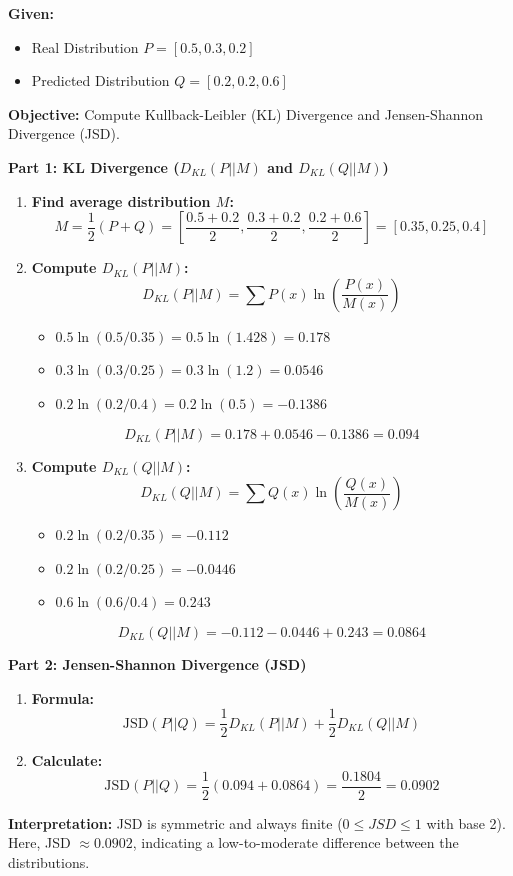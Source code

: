 \documentclass[11pt,a4paper]{article}
\begin{document}
\begin{tcolorbox}[colback=blue!5!white,colframe=blue!75!black,title=\textbf{Numerical 2: KL and JS Divergence}]
\textbf{Given:}
\begin{itemize}
    \item Real Distribution $P = [0.5, 0.3, 0.2]$
    \item Predicted Distribution $Q = [0.2, 0.2, 0.6]$
\end{itemize}

\textbf{Objective:} Compute Kullback-Leibler (KL) Divergence and Jensen-Shannon Divergence (JSD).

\textbf{Part 1: KL Divergence ($D_{KL}(P || M)$ and $D_{KL}(Q || M)$)}
\begin{enumerate}
    \item \textbf{Find average distribution $M$:}
    \[ M = \frac{1}{2}(P + Q) = \left[ \frac{0.5+0.2}{2}, \frac{0.3+0.2}{2}, \frac{0.2+0.6}{2} \right] = [0.35, 0.25, 0.4] \]
    \item \textbf{Compute $D_{KL}(P || M)$:}
    \[ D_{KL}(P || M) = \sum P(x) \ln\left(\frac{P(x)}{M(x)}\right) \]
    \begin{itemize}
        \item $0.5 \ln(0.5 / 0.35) = 0.5 \ln(1.428) = 0.178$
        \item $0.3 \ln(0.3 / 0.25) = 0.3 \ln(1.2) = 0.0546$
        \item $0.2 \ln(0.2 / 0.4) = 0.2 \ln(0.5) = -0.1386$
    \end{itemize}
    \[ D_{KL}(P || M) = 0.178 + 0.0546 - 0.1386 = 0.094 \]
    \item \textbf{Compute $D_{KL}(Q || M)$:}
    \[ D_{KL}(Q || M) = \sum Q(x) \ln\left(\frac{Q(x)}{M(x)}\right) \]
    \begin{itemize}
        \item $0.2 \ln(0.2 / 0.35) = -0.112$
        \item $0.2 \ln(0.2 / 0.25) = -0.0446$
        \item $0.6 \ln(0.6 / 0.4) = 0.243$
    \end{itemize}
    \[ D_{KL}(Q || M) = -0.112 - 0.0446 + 0.243 = 0.0864 \]
\end{enumerate}

\textbf{Part 2: Jensen-Shannon Divergence (JSD)}
\begin{enumerate}
    \item \textbf{Formula:}
    \[ \text{JSD}(P || Q) = \frac{1}{2} D_{KL}(P || M) + \frac{1}{2} D_{KL}(Q || M) \]
    \item \textbf{Calculate:}
    \[ \text{JSD}(P || Q) = \frac{1}{2} (0.094 + 0.0864) = \frac{0.1804}{2} = 0.0902 \]
\end{enumerate}
\textbf{Interpretation:} JSD is symmetric and always finite ($0 \le JSD \le 1$ with base 2). Here, JSD $\approx 0.0902$, indicating a low-to-moderate difference between the distributions.
\end{tcolorbox}
\end{document}
